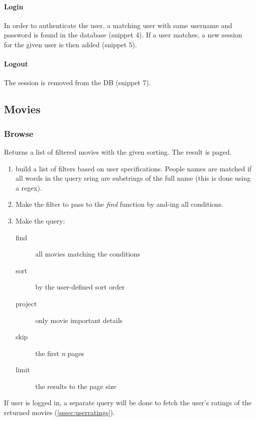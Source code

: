 \documentclass[11pt]{article}
\begin{document}
\paragraph{Login}
In order to authenticate the user, a matching user with same username and password is found in the database (snippet 4). If a user matches, a new session
for the given user is then added (snippet 5).

\paragraph{Logout}
The session is removed from the DB (snippet 7).



\subsection{Movies}
\subsubsection{Browse}
Returns a list of filtered movies with the given sorting. The result is paged.

\begin{enumerate}
	\item build a list of filters based on user specifications. People names are
			matched if all words in the query sring are substrings of the full 
			name (this is done using a regex).
	\item Make the filter to pass to the \emph{find} function by and-ing all 
			conditions.
	\item Make the query:
		\begin{description}
			\item[find] all movies matching the conditions
			\item[sort] by the user-defined sort order
			\item[project] only movie important details
			\item[skip] the first \emph{n} pages
			\item[limit] the results to the page size
		\end{description}
\end{enumerate}

If user is logged in, a separate query will be done to fetch the user's ratings of the returned movies (\ref{sssec:userratings}).


\end{document}
